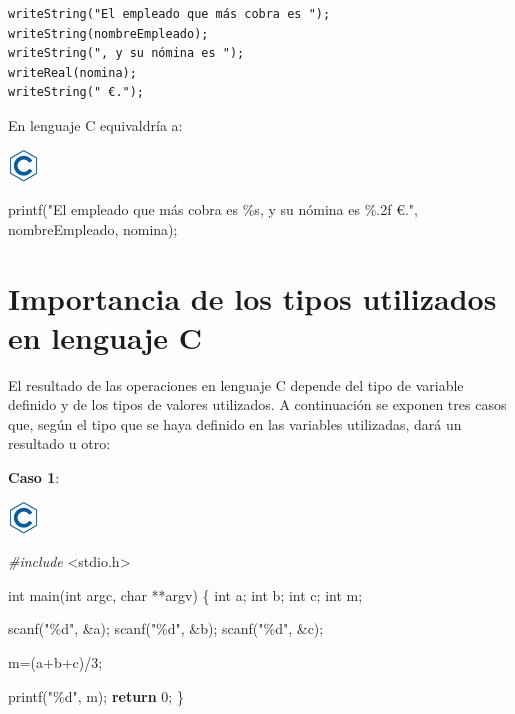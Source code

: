 \documentclass[
]{book}
\newenvironment{Shaded}{\begin{snugshade}}{\end{snugshade}}
\newcommand{\ControlFlowTok}[1]{\textcolor[rgb]{0.13,0.29,0.53}{\textbf{#1}}}
\newcommand{\DataTypeTok}[1]{\textcolor[rgb]{0.13,0.29,0.53}{#1}}
\newcommand{\DecValTok}[1]{\textcolor[rgb]{0.00,0.00,0.81}{#1}}
\newcommand{\ImportTok}[1]{#1}
\newcommand{\NormalTok}[1]{#1}
\newcommand{\PreprocessorTok}[1]{\textcolor[rgb]{0.56,0.35,0.01}{\textit{#1}}}
\newcommand{\StringTok}[1]{\textcolor[rgb]{0.31,0.60,0.02}{#1}}
\begin{document}
\begin{verbatim}
writeString("El empleado que más cobra es ");
writeString(nombreEmpleado);
writeString(", y su nómina es ");
writeReal(nomina);
writeString(" €.");
\end{verbatim}

En lenguaje C equivaldría a:

\includegraphics{./img/c.png}

\begin{Shaded}
\begin{Highlighting}[]
\NormalTok{printf(}\StringTok{"El empleado que más cobra es \%s, y su nómina es \%.2f €."}\NormalTok{, nombreEmpleado, nomina);}
\end{Highlighting}
\end{Shaded}

\hypertarget{importancia-de-los-tipos-utilizados-en-lenguaje-c}{%
\section{Importancia de los tipos utilizados en lenguaje C}\label{importancia-de-los-tipos-utilizados-en-lenguaje-c}}

El resultado de las operaciones en lenguaje C depende del tipo de variable definido y de los tipos de valores utilizados. A continuación se exponen tres casos que, según el tipo que se haya definido en las variables utilizadas, dará un resultado u otro:

\textbf{Caso 1}:

\includegraphics{./img/c.png}

\begin{Shaded}
\begin{Highlighting}[]
\PreprocessorTok{\#include }\ImportTok{\textless{}stdio.h\textgreater{}}

\DataTypeTok{int}\NormalTok{ main(}\DataTypeTok{int}\NormalTok{ argc, }\DataTypeTok{char}\NormalTok{ **argv) \{}
    \DataTypeTok{int}\NormalTok{ a;}
    \DataTypeTok{int}\NormalTok{ b;}
    \DataTypeTok{int}\NormalTok{ c;}
    \DataTypeTok{int}\NormalTok{ m;}

\NormalTok{    scanf(}\StringTok{"\%d"}\NormalTok{, \&a);}
\NormalTok{    scanf(}\StringTok{"\%d"}\NormalTok{, \&b);}
\NormalTok{    scanf(}\StringTok{"\%d"}\NormalTok{, \&c);}

\NormalTok{    m=(a+b+c)/}\DecValTok{3}\NormalTok{;}

\NormalTok{    printf(}\StringTok{"\%d"}\NormalTok{, m);}
    \ControlFlowTok{return} \DecValTok{0}\NormalTok{;}
\NormalTok{\}}
\end{Highlighting}
\end{Shaded}
\end{document}
